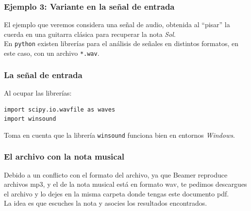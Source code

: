 \documentclass[12pt]{beamer}
\begin{document}
\begin{frame}
\frametitle{Ejemplo 3: Variante en la señal de entrada}
El ejemplo que veremos considera una señal de audio, obtenida al \enquote{pisar} la cuerda en una guitarra clásica para recuperar la nota \emph{Sol}.
\\
\bigskip
\pause
En \texttt{python} existen librerías para el análisis de señales en distintos formatos, en este caso, con un archivo \texttt{*.wav}.
\end{frame}
\begin{frame}[fragile]
\frametitle{La señal de entrada}
Al ocupar las librerías:
\begin{verbatim}
import scipy.io.wavfile as waves
import winsound
\end{verbatim}
Toma en cuenta que la librería \texttt{winsound} funciona bien en entornos \emph{Windows}.
\end{frame}
\begin{frame}
\frametitle{El archivo con la nota musical}
Debido a un conflicto con el formato del archivo, ya que Beamer reproduce archivos mp3, y el de la nota musical está en formato wav, te pedimos descargues el archivo y lo dejes en la misma carpeta donde tengas este documento pdf.
\\
\bigskip
La idea es que escuches la nota y asocies los resultados encontrados.
\end{frame}

\end{document}
